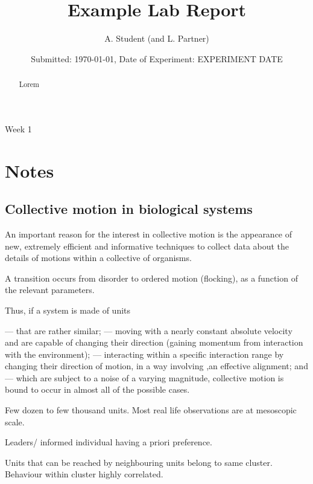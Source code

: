 \documentclass[10pt,twocolumn]{revtex4-2}    %
\begin{document}
\title{Example Lab Report} 
\date{Submitted: \today{}, Date of Experiment: EXPERIMENT DATE}
\author{A. Student (and L. Partner)}


\begin{abstract}              
 
Lorem

\end{abstract}

\maketitle

\thispagestyle{plain} %

Week 1
\section{Notes}

\subsection{Collective motion in biological systems}

An important reason for the interest in collective motion is the appearance of new, extremely efficient and informative techniques to collect data about the details of motions within a collective of organisms.

A transition occurs from disorder to ordered motion (flocking), as a function of the relevant parameters. 

Thus, if a system is made of units

— that are rather similar;
— moving with a nearly constant absolute velocity and are capable of changing their direction (gaining momentum from interaction with the environment);
— interacting within a speciﬁc interaction range by changing their direction of motion, in a way involving ,an effective alignment; and
— which are subject to a noise of a varying magnitude,
collective motion is bound to occur in almost all of the possible cases.

Few dozen to few thousand units. Most real life observations are at mesoscopic scale.

Leaders/ informed individual having a priori preference. 

Units that can be reached by neighbouring units belong to same cluster. Behaviour within cluster highly correlated. 
\end{document}
